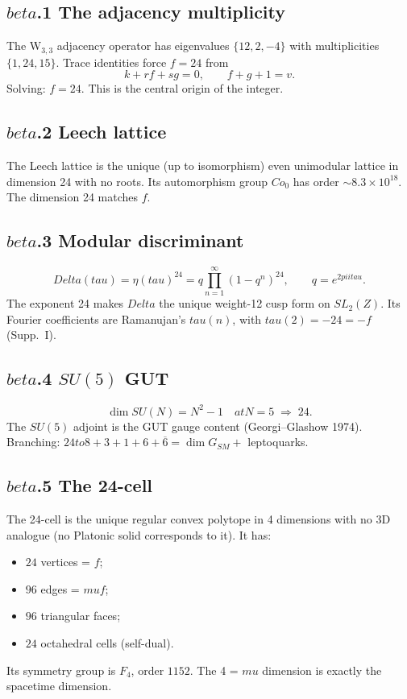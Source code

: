 \documentclass[12pt,a4paper]{article}
\def\mathbb#1{#1}%
\def\mathrm#1{#1}%
\def\mathbf#1{#1}%
\def\text#1{#1}%
\def\beta{beta}%
\def\Delta{Delta}%
\def\mu{mu}%
\def\pi{pi}%
\def\tau{tau}%
\def\to{ to }%
\theoremstyle{definition}
\newcommand{\SU}{\mathrm{SU}}
\newcommand{\ZZ}{\mathbb{Z}}
\begin{document}
\subsection*{$\beta$.1 \quad The adjacency multiplicity}
The W$_{3,3}$ adjacency operator has eigenvalues $\{12, 2, -4\}$ with
multiplicities $\{1, 24, 15\}$. Trace identities force $f=24$ from
\[
k + rf + sg = 0,\qquad f + g + 1 = v.
\]
Solving: $f = 24$. This is the central origin of the integer.

\subsection*{$\beta$.2 \quad Leech lattice}
The Leech lattice is the unique (up to isomorphism) even unimodular
lattice in dimension 24 with no roots. Its automorphism group
$\mathrm{Co}_0$ has order $\sim 8.3\times 10^{18}$. The dimension 24
matches $f$.

\subsection*{$\beta$.3 \quad Modular discriminant}
\[
\Delta(\tau) = \eta(\tau)^{24} = q\prod_{n=1}^{\infty}(1-q^n)^{24},
\qquad q = e^{2\pi i\tau}.
\]
The exponent 24 makes $\Delta$ the unique weight-12 cusp form on
$\mathrm{SL}_2(\ZZ)$. Its Fourier coefficients are Ramanujan's
$\tau(n)$, with $\tau(2) = -24 = -f$ (Supp.~I).

\subsection*{$\beta$.4 \quad $\SU(5)$ GUT}
\[
\dim\SU(N) = N^2 - 1\quad\text{at }N=5\;\Longrightarrow\;24.
\]
The $\SU(5)$ adjoint is the GUT gauge content (Georgi--Glashow 1974).
Branching: $\mathbf{24} \to \mathbf{8} + \mathbf{3} + \mathbf{1} +
\mathbf{6} + \overline{\mathbf{6}} = \dim G_{SM} + $ leptoquarks.

\subsection*{$\beta$.5 \quad The 24-cell}
The 24-cell is the unique regular convex polytope in 4 dimensions
with no 3D analogue (no Platonic solid corresponds to it). It has:
\begin{itemize}[leftmargin=2em,nosep]
\item $24$ vertices = $f$;
\item $96$ edges = $\mu f$;
\item $96$ triangular faces;
\item $24$ octahedral cells (self-dual).
\end{itemize}
Its symmetry group is $F_4$, order $1152$. The 4 = $\mu$ dimension is
exactly the spacetime dimension.
\end{document}
